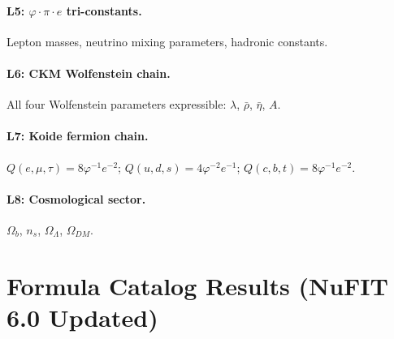 \documentclass[10pt,a4paper]{article}
\begin{document}
\paragraph{L5: $\varphi\cdot\pi\cdot e$ tri-constants.}
Lepton masses, neutrino mixing parameters, hadronic constants.

\paragraph{L6: CKM Wolfenstein chain.}
All four Wolfenstein parameters expressible: $\lambda$, $\bar\rho$, $\bar\eta$, $A$.

\paragraph{L7: Koide fermion chain.}
$Q(e,\mu,\tau) = 8\varphi^{-1}e^{-2}$; $Q(u,d,s) = 4\varphi^{-2}e^{-1}$; $Q(c,b,t) = 8\varphi^{-1}e^{-2}$.

\paragraph{L8: Cosmological sector.}
$\Omega_b$, $n_s$, $\Omega_\Lambda$, $\Omega_{DM}$.

\medskip

\section*{Formula Catalog Results (NuFIT 6.0 Updated)}
\end{document}
